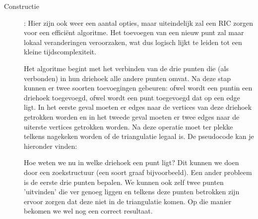 \documentclass[12pt,a4paper]{article}
\begin{document}
	\begin{description}
		\item[Constructie]: Hier zijn ook weer een aantal opties, maar uiteindelijk zal een RIC zorgen voor een efficiënt algoritme. Het toevoegen van een nieuw punt zal maar lokaal veranderingen veroorzaken, wat dus logisch lijkt te leiden tot een kleine tijdscomplexiteit. 
		
		Het algoritme begint met het verbinden van de drie punten die (als verbonden) in hun driehoek alle andere punten omvat. Na deze stap kunnen er twee soorten toevoegingen gebeuren: ofwel wordt een puntin een driehoek toegevoegd, ofwel wordt een punt toegevoegd dat op een edge ligt. In het eerste geval moeten er edges naar de vertices van deze driehoek getrokken worden en in het tweede geval moeten er twee edges naar de uiterste vertices getrokken worden. Na deze operatie moet ter plekke telkens nagekeken worden of de triangulatie legaal is. De pseudocode kan je hieronder vinden: 
		\begin{figure}[H]
			\centering
			\label{fig:delaunay-constructie}
		\end{figure}
		
		Hoe weten we nu in welke driehoek een punt ligt? Dit kunnen we doen door een zoekstructuur (een soort graaf bijvoorbeeld). Een ander probleem is de eerste drie punten bepalen. We kunnen ook zelf twee punten 'uitvinden' die ver genoeg liggen en telkens deze punten betrokken zijn ervoor zorgen dat deze niet in de triangulatie komen. Op die manier bekomen we wel nog een correct resultaat. 
		

\end{description}
\end{document}

